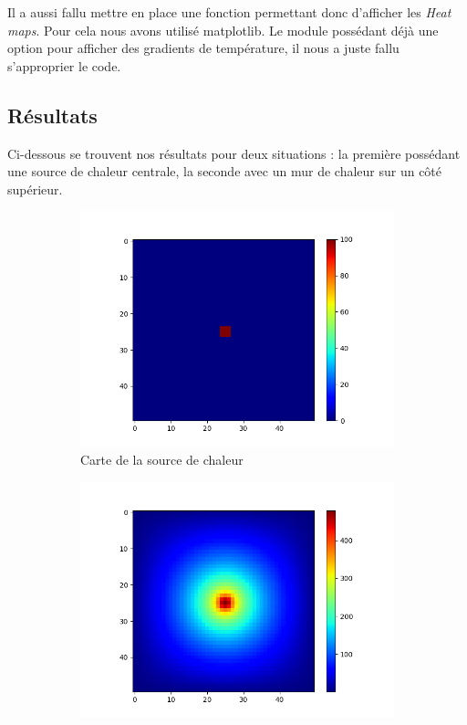\documentclass{article}
\begin{document}
Il a aussi fallu mettre en place une fonction permettant donc d'afficher les \emph{Heat maps}. Pour cela nous avons utilisé matplotlib.
Le module possédant déjà une option pour afficher des gradients de température, il nous a juste fallu s'approprier le code.


\subsection{Résultats}
\label{ssec:res}
Ci-dessous se trouvent nos résultats pour deux situations : la première possédant une source de chaleur centrale, la seconde avec un mur de chaleur sur un côté supérieur.

\begin{figure}[ht]
  \centering
  \begin{subfigure}{0.25\textwidth}
    \centering
    \includegraphics[width=\linewidth]{Chaleur_1.png}
    \caption{Carte de la source de chaleur}
    \label{subfig:central_source_prev}
  \end{subfigure}
  \hfill
  \begin{subfigure}{0.25\textwidth}
    \centering
    \includegraphics[width=\linewidth]{Chaleur_1b.png}

\end{subfigure}
\end{figure}
\end{document}
